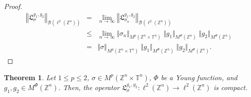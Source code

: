 \documentclass[a4paper,11pt, reqno]{amsart}
\theoremstyle{plain}
\newtheorem{theorem}{Theorem}[section]
\theoremstyle{definition}
\theoremstyle{remark}
\def \Z{{\mathbb Z}}
\def \T{{\mathbb T}}
\begin{document}
\begin{proof}
\begin{eqnarray*}
\left\Vert \mathfrak{L}^{g_1, g_2}_{\sigma} \right\Vert_{\mathcal{B}(\ell^2(\Z^n))} 
& = &  \lim_{n \to \infty} \left\Vert \mathfrak{L}^{g_1, g_2}_{\sigma_n} \right\Vert_{\mathcal{B}(\ell^2(\Z^n))} \\
& \leq & \lim_{n \to \infty} \Vert \sigma_n \Vert_{M^p(\Z^n \times \T^n)} \; \Vert g_1 \Vert_{M^{\Phi}(\Z^n)} \; \Vert g_2 \Vert_{M^{\Phi}(\Z^n)} \\
& =& \Vert \sigma \Vert_{M^p(\Z^n \times \T^n)} \; \Vert g_1 \Vert_{M^{\Phi}(\Z^n)} \; \Vert g_2 \Vert_{M^{\Phi}(\Z^n)}.
\end{eqnarray*}
\end{proof}

\begin{theorem}\label{th2}
Let $1 \leq p \leq 2$, $\sigma \in M^p(\Z^n \times \T^n)$, $\Phi$ be a Young function, and $g_1, g_2 \in  M^{\Phi}(\Z^n)$. Then, the operator $\mathfrak{L}^{g_1, g_2}_{\sigma}: \ell^2(\Z^n) \to \ell^2(\Z^n) $ is compact. 
\end{theorem}  
\end{document}
